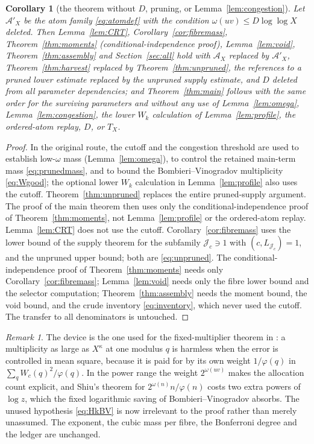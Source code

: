 \documentclass[10pt,reqno]{amsart}
\newtheorem{corollary}[theorem]{Corollary}
\theoremstyle{remark}
\newtheorem{remark}[theorem]{Remark}
\newcommand{\J}{\mathcal J}
\newcommand{\A}{\mathcal A}
\begin{document}
\begin{corollary}[the theorem without $D$, pruning, or
Lemma~\ref{lem:congestion}]\label{cor:noD}
Let $\A'_X$ be the atom family \eqref{eq:atomdef} with the condition
$\omega(uv)\leq D\log\log X$ deleted.  Then Lemma~\ref{lem:CRT},
Corollary~\ref{cor:fibremass}, Theorem~\ref{thm:moments}
(conditional-independence proof), Lemma~\ref{lem:void},
Theorem~\ref{thm:assembly} and Section~\ref{sec:all} hold with $\A_X$
replaced by $\A'_X$, Theorem~\ref{thm:harvest} replaced by
Theorem~\ref{thm:unpruned}, the references to a pruned lower estimate
replaced by the unpruned supply estimate, and $D$ deleted from all
parameter dependencies; and Theorem~\ref{thm:main} follows with the
same order for the surviving parameters and without any use of
Lemma~\ref{lem:omega}, Lemma~\ref{lem:congestion}, the lower $W_k$
calculation of Lemma~\ref{lem:profile}, the ordered-atom replay, $D$,
or $T_X$.
\end{corollary}
\begin{proof}
In the original route, the cutoff and the congestion threshold are
used to establish low-$\omega$ mass (Lemma~\ref{lem:omega}), to control
the retained main-term mass \eqref{eq:prunedmass}, and to bound the
Bombieri--Vinogradov multiplicity \eqref{eq:Wgood}; the optional lower
$W_k$ calculation in Lemma~\ref{lem:profile} also uses the cutoff.
Theorem~\ref{thm:unpruned} replaces the entire pruned-supply argument.
The proof of the main theorem then uses only the conditional-independence
proof of Theorem~\ref{thm:moments}, not Lemma~\ref{lem:profile} or the
ordered-atom replay.  Lemma~\ref{lem:CRT} does not use the cutoff.  Corollary~\ref{cor:fibremass}
uses the lower bound of the supply theorem for the subfamily
$\J_c\ni1$ with $(c,L_{\J_c})=1$, and the unpruned upper bound; both
are \eqref{eq:unpruned}.  The conditional-independence proof of
Theorem~\ref{thm:moments} needs only Corollary~\ref{cor:fibremass};
Lemma~\ref{lem:void} needs only the fibre lower bound and the selector
computation; Theorem~\ref{thm:assembly} needs the moment bound, the
void bound, and the crude inventory \eqref{eq:inventory}, which never
used the cutoff.  The transfer to all denominators is untouched.
\end{proof}

\begin{remark}
The device is the one used for the fixed-multiplier theorem in
\cite[Section~4]{LL}: a multiplicity as large as $X^\kappa$ at one
modulus $q$ is harmless when the error is controlled in mean square,
because it is paid for by its own weight $1/\varphi(q)$ in
$\sum_qW_c(q)^2/\varphi(q)$.  In the power range the weight
$2^{\omega(uv)}$ makes the allocation count explicit, and Shiu's
theorem for $2^{\omega(n)}n/\varphi(n)$ costs two extra powers of
$\log z$, which the fixed logarithmic saving of Bombieri--Vinogradov
absorbs.  The unused hypothesis \eqref{eq:HkBV} is now irrelevant to the
proof rather than merely unassumed.  The exponent, the cubic mass per
fibre, the Bonferroni degree and the ledger are unchanged.
\end{remark}
\end{document}
